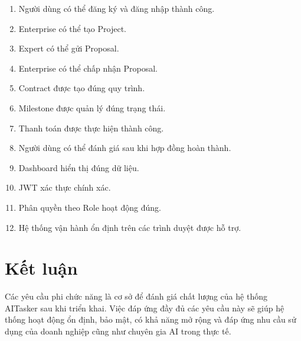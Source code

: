 \begin{enumerate}

\item Người dùng có thể đăng ký và đăng nhập thành công.

\item Enterprise có thể tạo Project.

\item Expert có thể gửi Proposal.

\item Enterprise có thể chấp nhận Proposal.

\item Contract được tạo đúng quy trình.

\item Milestone được quản lý đúng trạng thái.

\item Thanh toán được thực hiện thành công.

\item Người dùng có thể đánh giá sau khi hợp đồng hoàn thành.

\item Dashboard hiển thị đúng dữ liệu.

\item JWT xác thực chính xác.

\item Phân quyền theo Role hoạt động đúng.

\item Hệ thống vận hành ổn định trên các trình duyệt được hỗ trợ.

\end{enumerate}


\section{Kết luận}

Các yêu cầu phi chức năng là cơ sở để đánh giá chất lượng của hệ thống
AITasker sau khi triển khai. Việc đáp ứng đầy đủ các yêu cầu này sẽ giúp hệ
thống hoạt động ổn định, bảo mật, có khả năng mở rộng và đáp ứng nhu cầu sử
dụng của doanh nghiệp cũng như chuyên gia AI trong thực tế.